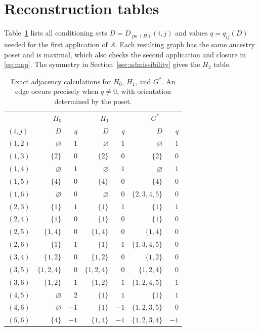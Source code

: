 \documentclass[11pt]{article}
\newcommand{\po}{\operatorname{po}}
\begin{document}
\section{Reconstruction tables}
Table~\ref{tab:adjacency} lists all conditioning sets $D=D_{\po(H)}(i,j)$
and values $q=q_{ij}(D)$ needed for the first application of $A$.
Each resulting graph has the same ancestry poset and is maximal, which
also checks the second application and closure in \eqref{eq:map}.
The symmetry in Section~\ref{sec:admissibility} gives the $H_2$ table.
\begin{table}[!ht]
\centering\small\setlength{\tabcolsep}{6pt}
\begin{tabular}{@{}lrrrrrr@{}}\toprule
&\multicolumn{2}{c}{$H_0$}&\multicolumn{2}{c}{$H_1$}&\multicolumn{2}{c}{$G^*$}\\
$(i,j)$&$D$&$q$&$D$&$q$&$D$&$q$\\\midrule
$(1,2)$&$\varnothing$&$1$&$\varnothing$&$1$&$\varnothing$&$1$\\
$(1,3)$&$\{2\}$&$0$&$\{2\}$&$0$&$\{2\}$&$0$\\
$(1,4)$&$\varnothing$&$1$&$\varnothing$&$1$&$\varnothing$&$1$\\
$(1,5)$&$\{4\}$&$0$&$\{4\}$&$0$&$\{4\}$&$0$\\
$(1,6)$&$\varnothing$&$0$&$\varnothing$&$0$&$\{2,3,4,5\}$&$0$\\
$(2,3)$&$\{1\}$&$1$&$\{1\}$&$1$&$\{1\}$&$1$\\
$(2,4)$&$\{1\}$&$0$&$\{1\}$&$0$&$\{1\}$&$0$\\
$(2,5)$&$\{1,4\}$&$0$&$\{1,4\}$&$0$&$\{1,4\}$&$0$\\
$(2,6)$&$\{1\}$&$1$&$\{1\}$&$1$&$\{1,3,4,5\}$&$0$\\
$(3,4)$&$\{1,2\}$&$0$&$\{1,2\}$&$0$&$\{1,2\}$&$0$\\
$(3,5)$&$\{1,2,4\}$&$0$&$\{1,2,4\}$&$0$&$\{1,2,4\}$&$0$\\
$(3,6)$&$\{1,2\}$&$1$&$\{1,2\}$&$1$&$\{1,2,4,5\}$&$1$\\
$(4,5)$&$\varnothing$&$2$&$\{1\}$&$1$&$\{1\}$&$1$\\
$(4,6)$&$\varnothing$&$-1$&$\{1\}$&$-1$&$\{1,2,3,5\}$&$0$\\
$(5,6)$&$\{4\}$&$-1$&$\{1,4\}$&$-1$&$\{1,2,3,4\}$&$-1$\\
\bottomrule\end{tabular}
\caption{Exact adjacency calculations for $H_0$, $H_1$, and $G^*$.
An edge occurs precisely when $q\ne0$, with orientation determined by the poset.}
\label{tab:adjacency}\end{table}
\end{document}
